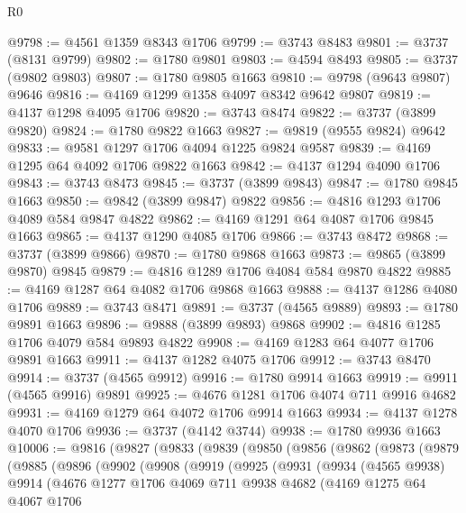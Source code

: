 \begin{lexlean}{R0}
\begin{coremodule}
@9798 := @4561 @1359 @8343 @1706
@9799 := @3743 @8483
@9801 := @3737 (@8131 @9799)
@9802 := @1780 @9801
@9803 := @4594 @8493
@9805 := @3737 (@9802 @9803)
@9807 := @1780 @9805 @1663
@9810 := @9798 (@9643 @9807) @9646
@9816 := @4169 @1299 @1358 @4097 @8342 @9642 @9807
@9819 := @4137 @1298 @4095 @1706
@9820 := @3743 @8474
@9822 := @3737 (@3899 @9820)
@9824 := @1780 @9822 @1663
@9827 := @9819 (@9555 @9824) @9642
@9833 := @9581 @1297 @1706 @4094 @1225 @9824 @9587
@9839 := @4169 @1295 @64 @4092 @1706 @9822 @1663
@9842 := @4137 @1294 @4090 @1706
@9843 := @3743 @8473
@9845 := @3737 (@3899 @9843)
@9847 := @1780 @9845 @1663
@9850 := @9842 (@3899 @9847) @9822
@9856 := @4816 @1293 @1706 @4089 @584 @9847 @4822
@9862 := @4169 @1291 @64 @4087 @1706 @9845 @1663
@9865 := @4137 @1290 @4085 @1706
@9866 := @3743 @8472
@9868 := @3737 (@3899 @9866)
@9870 := @1780 @9868 @1663
@9873 := @9865 (@3899 @9870) @9845
@9879 := @4816 @1289 @1706 @4084 @584 @9870 @4822
@9885 := @4169 @1287 @64 @4082 @1706 @9868 @1663
@9888 := @4137 @1286 @4080 @1706
@9889 := @3743 @8471
@9891 := @3737 (@4565 @9889)
@9893 := @1780 @9891 @1663
@9896 := @9888 (@3899 @9893) @9868
@9902 := @4816 @1285 @1706 @4079 @584 @9893 @4822
@9908 := @4169 @1283 @64 @4077 @1706 @9891 @1663
@9911 := @4137 @1282 @4075 @1706
@9912 := @3743 @8470
@9914 := @3737 (@4565 @9912)
@9916 := @1780 @9914 @1663
@9919 := @9911 (@4565 @9916) @9891
@9925 := @4676 @1281 @1706 @4074 @711 @9916 @4682
@9931 := @4169 @1279 @64 @4072 @1706 @9914 @1663
@9934 := @4137 @1278 @4070 @1706
@9936 := @3737 (@4142 @3744)
@9938 := @1780 @9936 @1663
@10006 := @9816
    (@9827
      (@9833
        (@9839
          (@9850
            (@9856
              (@9862
                (@9873
                  (@9879
                    (@9885
                      (@9896
                        (@9902
                          (@9908
                            (@9919
                              (@9925
                                (@9931
                                  (@9934
                                    (@4565 @9938)
                                    @9914
                                    (@4676
                                      @1277
                                      @1706
                                      @4069
                                      @711
                                      @9938
                                      @4682
                                      (@4169
                                        @1275
                                        @64
                                        @4067
                                        @1706

\end{coremodule}
\end{lexlean}
